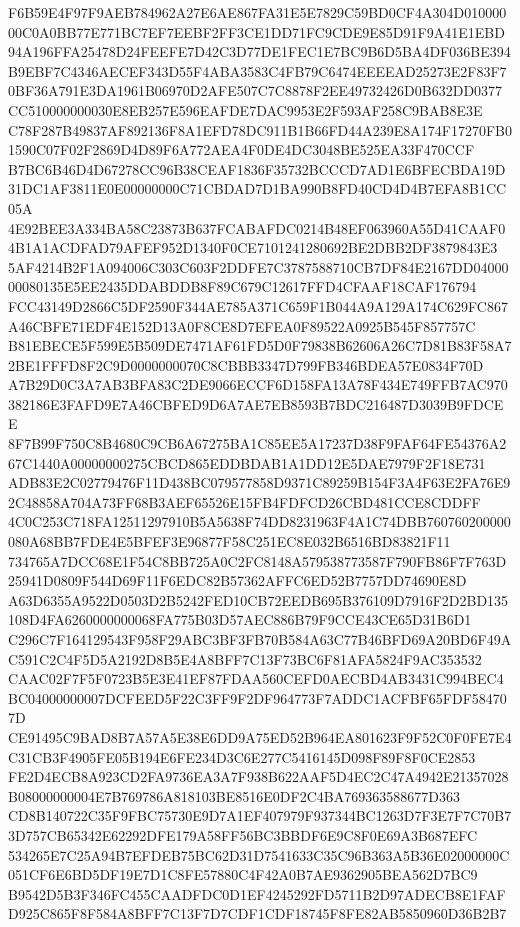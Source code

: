 \documentclass[UTF8,fontset=fandol,zihao=-4,a4paper]{ctexart}
\begin{document}
{{F6B59E4F97F9AEB784962A27E6AE867FA31E5E7829C59BD0CF4A304D01000000C0A0BB77E771BC7EF7EEBF2FF3CE1DD71FC9CDE9E85D91F9A41E1EBD
94A196FFA25478D24FEEFE7D42C3D77DE1FEC1E7BC9B6D5BA4DF036BE394B9EBF7C4346AECEF343D55F4ABA3583C4FB79C6474EEEEAD25273E2F83F7
0BF36A791E3DA1961B06970D2AFE507C7C8878F2EE49732426D0B632DD0377CC510000000030E8EB257E596EAFDE7DAC9953E2F593AF258C9BAB8E3E
C78F287B49837AF892136F8A1EFD78DC911B1B66FD44A239E8A174F17270FB01590C07F02F2869D4D89F6A772AEA4F0DE4DC3048BE525EA33F470CCF
B7BC6B46D4D67278CC96B38CEAF1836F35732BCCCD7AD1E6BFECBDA19D31DC1AF3811E0E00000000C71CBDAD7D1BA990B8FD40CD4D4B7EFA8B1CC05A
4E92BEE3A334BA58C23873B637FCABAFDC0214B48EF063960A55D41CAAF04B1A1ACDFAD79AFEF952D1340F0CE7101241280692BE2DBB2DF3879843E3
5AF4214B2F1A094006C303C603F2DDFE7C3787588710CB7DF84E2167DD0400000080135E5EE2435DDABDDB8F89C679C12617FFD4CFAAF18CAF176794
FCC43149D2866C5DF2590F344AE785A371C659F1B044A9A129A174C629FC867A46CBFE71EDF4E152D13A0F8CE8D7EFEA0F89522A0925B545F857757C
B81EBECE5F599E5B509DE7471AF61FD5D0F79838B62606A26C7D81B83F58A72BE1FFFD8F2C9D0000000070C8CBBB3347D799FB346BDEA57E0834F70D
A7B29D0C3A7AB3BFA83C2DE9066ECCF6D158FA13A78F434E749FFB7AC970382186E3FAFD9E7A46CBFED9D6A7AE7EB8593B7BDC216487D3039B9FDCEE
8F7B99F750C8B4680C9CB6A67275BA1C85EE5A17237D38F9FAF64FE54376A267C1440A00000000275CBCD865EDDBDAB1A1DD12E5DAE7979F2F18E731
ADB83E2C02779476F11D438BC079577858D9371C89259B154F3A4F63E2FA76E92C48858A704A73FF68B3AEF65526E15FB4FDFCD26CBD481CCE8CDDFF
4C0C253C718FA12511297910B5A5638F74DD8231963F4A1C74DBB760760200000080A68BB7FDE4E5BFEF3E96877F58C251EC8E032B6516BD83821F11
734765A7DCC68E1F54C8BB725A0C2FC8148A579538773587F790FB86F7F763D25941D0809F544D69F11F6EDC82B57362AFFC6ED52B7757DD74690E8D
A63D6355A9522D0503D2B5242FED10CB72EEDB695B376109D7916F2D2BD135108D4FA6260000000068FA775B03D57AEC886B79F9CCE43CE65D31B6D1
C296C7F164129543F958F29ABC3BF3FB70B584A63C77B46BFD69A20BD6F49AC591C2C4F5D5A2192D8B5E4A8BFF7C13F73BC6F81AFA5824F9AC353532
CAAC02F7F5F0723B5E3E41EF87FDAA560CEFD0AECBD4AB3431C994BEC4BC04000000007DCFEED5F22C3FF9F2DF964773F7ADDC1ACFBF65FDF584707D
CE91495C9BAD8B7A57A5E38E6DD9A75ED52B964EA801623F9F52C0F0FE7E4C31CB3F4905FE05B194E6FE234D3C6E277C5416145D098F89F8F0CE2853
FE2D4ECB8A923CD2FA9736EA3A7F938B622AAF5D4EC2C47A4942E21357028B08000000004E7B769786A818103BE8516E0DF2C4BA769363588677D363
CD8B140722C35F9FBC75730E9D7A1EF407979F937344BC1263D7F3E7F7C70B73D757CB65342E62292DFE179A58FF56BC3BBDF6E9C8F0E69A3B687EFC
534265E7C25A94B7EFDEB75BC62D31D7541633C35C96B363A5B36E02000000C051CF6E6BD5DF19E7D1C8FE57880C4F42A0B7AE9362905BEA562D7BC9
B9542D5B3F346FC455CAADFDC0D1EF4245292FD5711B2D97ADECB8E1FAFD925C865F8F584A8BFF7C13F7D7CDF1CDF18745F8FE82AB5850960D36B2B7
}}
\end{document}
